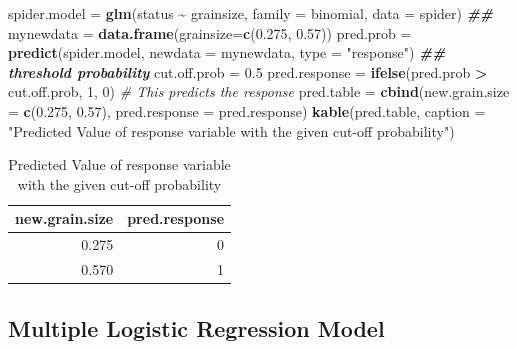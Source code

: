 \documentclass[
]{book}
\newenvironment{Shaded}{\begin{snugshade}}{\end{snugshade}}
\newcommand{\AttributeTok}[1]{\textcolor[rgb]{0.13,0.29,0.53}{#1}}
\newcommand{\CommentTok}[1]{\textcolor[rgb]{0.56,0.35,0.01}{\textit{#1}}}
\newcommand{\DecValTok}[1]{\textcolor[rgb]{0.00,0.00,0.81}{#1}}
\newcommand{\DocumentationTok}[1]{\textcolor[rgb]{0.56,0.35,0.01}{\textbf{\textit{#1}}}}
\newcommand{\FloatTok}[1]{\textcolor[rgb]{0.00,0.00,0.81}{#1}}
\newcommand{\FunctionTok}[1]{\textcolor[rgb]{0.13,0.29,0.53}{\textbf{#1}}}
\newcommand{\NormalTok}[1]{#1}
\newcommand{\OtherTok}[1]{\textcolor[rgb]{0.56,0.35,0.01}{#1}}
\newcommand{\SpecialCharTok}[1]{\textcolor[rgb]{0.81,0.36,0.00}{\textbf{#1}}}
\newcommand{\StringTok}[1]{\textcolor[rgb]{0.31,0.60,0.02}{#1}}
\begin{document}
\begin{Shaded}
\begin{Highlighting}[]
\NormalTok{spider.model }\OtherTok{=} \FunctionTok{glm}\NormalTok{(status }\SpecialCharTok{\textasciitilde{}}\NormalTok{ grainsize, }
                   \AttributeTok{family =}\NormalTok{ binomial,}
                   \AttributeTok{data =}\NormalTok{ spider)}
\DocumentationTok{\#\# }
\NormalTok{mynewdata }\OtherTok{=} \FunctionTok{data.frame}\NormalTok{(}\AttributeTok{grainsize=}\FunctionTok{c}\NormalTok{(}\FloatTok{0.275}\NormalTok{, }\FloatTok{0.57}\NormalTok{))}
\NormalTok{pred.prob }\OtherTok{=} \FunctionTok{predict}\NormalTok{(spider.model, }\AttributeTok{newdata =}\NormalTok{ mynewdata, }
        \AttributeTok{type =} \StringTok{"response"}\NormalTok{)}
\DocumentationTok{\#\# threshold probability}
\NormalTok{cut.off.prob }\OtherTok{=} \FloatTok{0.5}
\NormalTok{pred.response }\OtherTok{=} \FunctionTok{ifelse}\NormalTok{(pred.prob }\SpecialCharTok{\textgreater{}}\NormalTok{ cut.off.prob, }\DecValTok{1}\NormalTok{, }\DecValTok{0}\NormalTok{)  }\CommentTok{\# This predicts the response}
\NormalTok{pred.table }\OtherTok{=} \FunctionTok{cbind}\NormalTok{(}\AttributeTok{new.grain.size =} \FunctionTok{c}\NormalTok{(}\FloatTok{0.275}\NormalTok{, }\FloatTok{0.57}\NormalTok{), }\AttributeTok{pred.response =}\NormalTok{ pred.response)}
\FunctionTok{kable}\NormalTok{(pred.table, }\AttributeTok{caption =} \StringTok{"Predicted Value of response variable }
\StringTok{      with the given cut{-}off probability"}\NormalTok{)}
\end{Highlighting}
\end{Shaded}

\begin{table}

\caption{\label{tab:unnamed-chunk-98}Predicted Value of response variable 
      with the given cut-off probability}
\centering
\begin{tabular}[t]{r|r}
\hline
new.grain.size & pred.response\\
\hline
0.275 & 0\\
\hline
0.570 & 1\\
\hline
\end{tabular}
\end{table}

\hypertarget{multiple-logistic-regression-model}{%
\subsection{Multiple Logistic Regression Model}\label{multiple-logistic-regression-model}}
\end{document}
